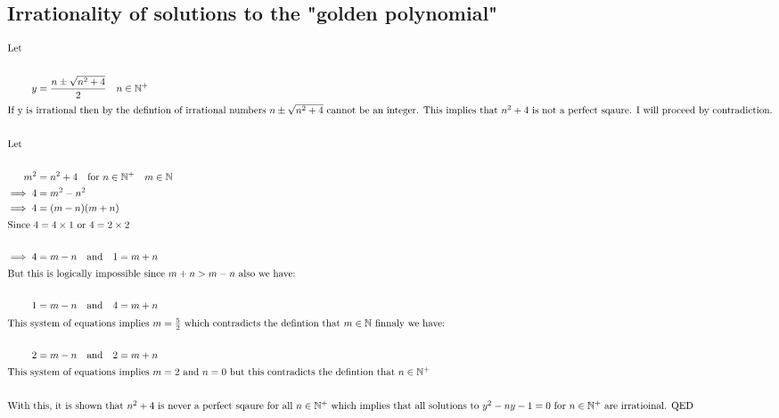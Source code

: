 \documentclass[a4paper]{article}
\begin{document}
\subsection*{Irrationality of solutions to the "golden polynomial"}
\begin{align*}
    \intertext{Let}\\
    y&=\frac{n\pm\sqrt{n^2+4}}{2}\quad n \in \mathbb{N^+}\\
    \intertext{If y is irrational then by the defintion of irrational numbers $n\pm\sqrt{n^2+4}$ cannot be an integer. This implies that $n^2 + 4$ is not a perfect sqaure. I will proceed by contradiction.}\\
    \intertext{Let}\\
    m^2 &= n^2 + 4\quad\text{for $n \in \mathbb{N^+} \quad m \in \mathbb{N}$}\\
    \implies 4 &= m^2 - n^2\\
    \implies 4 &= (m-n)(m+n)\\
    \intertext{Since $4=4\times1$ or $4=2\times2$}\\
    \implies 4 &= m-n\quad\text{and}\quad 1=m+n\\
    \intertext{But this is logically impossible since $m+n>m-n$ also we have:}\\
    1&=m-n\quad\text{and}\quad 4=m+n\\
    \intertext{This system of equations implies $m=\frac{5}{2}$ which contradicts the defintion that $m\in\mathbb{N}$ finnaly we have:}\\
    2&=m-n\quad\text{and}\quad 2 = m+n\\
    \intertext{This system of equations implies $m=2$ and $n=0$ but this contradicts the defintion that $n\in\mathbb{N^+}$}\\
    \intertext{With this, it is shown that $n^2+4$ is never a perfect sqaure for all $n\in\mathbb{N^+}$ which implies that all solutions to $y^2-ny-1=0$ for $n\in\mathbb{N^+}$ are irratioinal. QED}
\end{align*}
\end{document}
